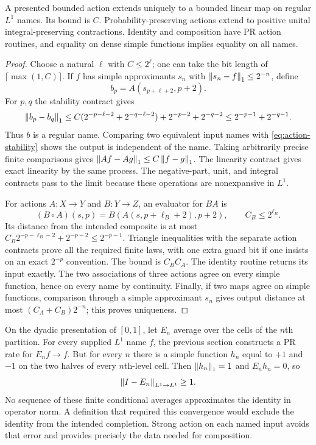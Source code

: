 \begin{theorem}\label{thm:action-extension}
A presented bounded action extends uniquely to a bounded linear map on
regular $L^1$ names. Its bound is $C$. Probability-preserving actions extend
to positive unital integral-preserving contractions. Identity and
composition have PR action routines, and equality on dense simple
functions implies equality on all names.
\end{theorem}
\begin{proof}
Choose a natural $\ell$ with $C\le2^\ell$; one can take the bit length of
$\lceil\max(1,C)\rceil$. If $f$ has simple approximants $s_n$ with
$\left\lVert s_n-f\right\rVert_1\le2^{-n}$, define
\[
 b_p=A(s_{p+\ell+2},p+2).
\]
For $p,q$ the stability contract gives
\[
 \left\lVert b_p-b_q\right\rVert_1
 \le C(2^{-p-\ell-2}+2^{-q-\ell-2})
      +2^{-p-2}+2^{-q-2}
 \le2^{-p-1}+2^{-q-1}.
\]
Thus $b$ is a regular name. Comparing two equivalent input names with
\eqref{eq:action-stability} shows the output is independent of the name.
Taking arbitrarily precise finite comparisons gives
$\left\lVert Af-Ag\right\rVert_1\le C\left\lVert f-g\right\rVert_1$. The linearity contract gives exact
linearity by the same process. The negative-part, unit, and integral
contracts pass to the limit because these operations are nonexpansive in
$L^1$.

For actions $A:X\to Y$ and $B:Y\to Z$, an evaluator for $BA$ is
\[
 (B\circ A)(s,p)=B(A(s,p+\ell_B+2),p+2),
 \qquad C_B\le2^{\ell_B}.
\]
Its distance from the intended composite is at most
$C_B2^{-p-\ell_B-2}+2^{-p-2}\le2^{-p-1}$.
Triangle inequalities with the separate action contracts prove all the
required finite laws, with one extra guard bit if one insists on an exact
$2^{-p}$ convention. The bound is $C_BC_A$. The identity routine returns
its input exactly. The two associations of three actions agree on every
simple function, hence on every name by continuity. Finally, if two maps
agree on simple functions, comparison through a simple approximant $s_n$
gives output distance at most $(C_A+C_B)2^{-n}$; this proves uniqueness.
\end{proof}

\begin{example}\label{ex:no-operator-norm}
On the dyadic presentation of $[0,1]$, let $E_n$ average over the cells of
the $n$th partition. For every supplied $L^1$ name $f$, the previous
section constructs a PR rate for $E_nf\to f$. But for every $n$ there is
a simple function $h_n$ equal to $+1$ and $-1$ on the two halves of every
$n$th-level cell. Then $\left\lVert h_n\right\rVert_1=1$ and $E_nh_n=0$, so
\[
 \left\lVert I-E_n\right\rVert_{L^1\to L^1}\ge1.
\]
No sequence of these finite conditional averages approximates the identity
in operator norm. A definition that required this convergence would
exclude the identity from the intended completion. Strong action on each
named input avoids that error and provides precisely the data needed for
composition.
\end{example}

